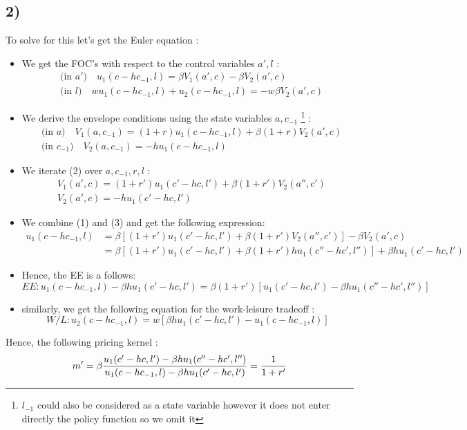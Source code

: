 \documentclass{article}
\begin{document}
\subsection{2)}
To solve for this let's get the Euler equation : 
\begin{itemize}
    \item We get the FOC's with respect to the control variables $a',l$ :
\begin{equation}\begin{aligned}
    &\text{(in $a'$)} \quad u_1(c-hc_{-1},l) = \beta V_1(a',c)-\beta V_2(a',c)\\
    &\text{(in $l$)} \quad wu_1(c-hc_{-1},l)+u_2(c-hc_{-1},l) = -w\beta V_2(a',c)
\end{aligned}\end{equation}
    \item We derive the envelope conditions using the state variables $a,c_{-1}$ \footnote{$l_{-1}$ could also be considered as a state variable however it does not enter directly the policy function so we omit it} : 
\begin{equation}\begin{aligned}
    &\text{(in $a$)} \quad V_1(a,c_{-1})=(1+r)u_1(c-hc_{-1},l)+\beta(1+r)V_2(a',c)\\
    &\text{(in $c_{-1}$)} \quad V_2(a,c_{-1}) = -hu_1(c-hc_{-1},l)
\end{aligned}\end{equation}
    \item We iterate (2) over $a,c_{-1},r,l$ : 
    \begin{equation}
        \begin{aligned}
            &V_1(a',c) = (1+r')u_1(c'-hc,l')+\beta (1+r')V_2(a'',c')\\
            &V_2(a',c) = -hu_1(c'-hc,l')
        \end{aligned}
    \end{equation}
    \item We combine (1) and (3) and get the following expression: 
    \begin{equation}
        \begin{aligned}
            u_1(c-hc_{-1},l) &= \beta [(1+r')u_1(c'-hc,l')+\beta (1+r')V_2(a'',c')]-\beta V_2(a',c) \\
            &= \beta[(1+r')u_1(c'-hc,l')+\beta(1+r')hu_1(c''-hc',l'')]+\beta hu_1(c'-hc,l') 
        \end{aligned}
    \end{equation}
    \item Hence, the EE is a follows:  
    $$EE : u_1(c-hc_{-1},l)-\beta hu_1(c'-hc,l') = \beta (1+r') [u_1(c'-hc,l')-\beta hu_1(c''-hc',l'')]$$
    \item similarly, we get the following equation for the work-leisure tradeoff : 
    $$W/L : u_2(c-hc_{-1},l) = w[\beta hu_1(c'-hc,l')-u_1(c-hc_{-1},l)]$$
\end{itemize}
Hence, the following pricing kernel : 
$$m' = \beta \frac{u_1(c'-hc,l')-\beta hu_1(c''-hc',l'')}{u_1(c-hc_{-1},l)-\beta hu_1(c'-hc,l')}\\= \frac{1}{1+r'}$$
\end{document}
